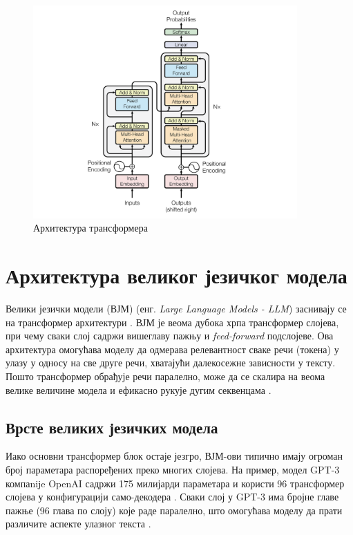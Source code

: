 \documentclass[a4paper, 12pt, master, utf8]{etf}
\begin{document}
\begin{figure}[h]
    \centering
    \includegraphics[width=0.9\textwidth]{images/transformer.png}
    \caption{Архитектура трансформера}
    \label{fig:transformer}
\end{figure}

\section{Архитектура великог језичког модела}
\label{sec:llm_architecture}

Велики језички модели (ВЈМ) (енг. \textit{Large Language Models - LLM}) заснивају се на трансформер архитектури \cite{vaswani_attention_2017}. ВЈМ је веома дубока хрпа трансформер слојева, при чему сваки слој садржи вишеглаву пажњу и \textit{feed-forward} подслојеве. Ова архитектура омогућава моделу да одмерава релевантност сваке речи (токена) у улазу у односу на све друге речи, хватајући далекосежне зависности у тексту. Пошто трансформер обрађује речи паралелно, може да се скалира на веома велике величине модела и ефикасно рукује дугим секвенцама \cite{vaswani_attention_2017}.

\subsection{Врсте великих језичких модела}

Иако основни трансформер блок остаје језгро, ВЈМ-ови типично имају огроман број параметара распоређених преко многих слојева. На пример, модел GPT-3 компаnije OpenAI садржи 175 милијарди параметара и користи 96 трансформер слојева у конфигурацији само-декодера \cite{brown_language_2020}. Сваки слој у GPT-3 има бројне главе пажње (96 глава по слоју) које раде паралелно, што омогућава моделу да прати различите аспекте улазног текста \cite{brown_language_2020}.
\end{document}
